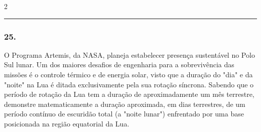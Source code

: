 \documentclass[twoside, 10pt, a4paper]{article}
\newlength{\espacoPreQuestao}\setlength{\espacoPreQuestao}{0.1cm}
\newlength{\espacoQuestao}\setlength{\espacoQuestao}{0.2cm}
\begin{document}
\begin{multicols*}{2}
\noindent\textcolor{CorLinha}{\rule{\linewidth}{0.5pt}} 
\par\vspace{\espacoPreQuestao}
\subsubsection*{25.} O Programa Artemis, da NASA, planeja estabelecer presença sustentável no Polo Sul lunar. Um dos maiores desafios de engenharia para a sobrevivência das missões é o controle térmico e de energia solar, visto que a duração do "dia" e da "noite" na Lua é ditada exclusivamente pela sua rotação síncrona. Sabendo que o período de rotação da Lua tem a duração de aproximadamente um mês terrestre, demonstre matematicamente a duração aproximada, em dias terrestres, de um período contínuo de escuridão total (a "noite lunar") enfrentado por uma base posicionada na região equatorial da Lua.
\par\vspace{\espacoQuestao}

\end{multicols*}
\end{document}
